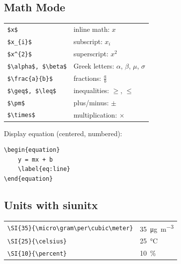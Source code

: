 \documentclass[../main.tex]{subfiles}
\begin{document}
\vspace{1em}

\subsection*{Math Mode}
\begin{tabular}{ll}
\texttt{\$x\$} & inline math: $x$ \\
\texttt{\$x\_\{i\}\$} & subscript: $x_{i}$ \\
\texttt{\$x\^{}\{2\}\$} & superscript: $x^{2}$ \\
\texttt{\$\textbackslash alpha\$, \$\textbackslash beta\$} & Greek letters: $\alpha$, $\beta$, $\mu$, $\sigma$ \\
\texttt{\$\textbackslash frac\{a\}\{b\}\$} & fractions: $\frac{a}{b}$ \\
\texttt{\$\textbackslash geq\$, \$\textbackslash leq\$} & inequalities: $\geq$, $\leq$ \\
\texttt{\$\textbackslash pm\$} & plus/minus: $\pm$ \\
\texttt{\$\textbackslash times\$} & multiplication: $\times$ \\
\end{tabular}

\vspace{0.5em}

Display equation (centered, numbered):
\begin{verbatim}
\begin{equation}
    y = mx + b
    \label{eq:line}
\end{equation}
\end{verbatim}

\vspace{1em}

\subsection*{Units with siunitx}
\begin{tabular}{ll}
\texttt{\textbackslash SI\{35\}\{\textbackslash micro\textbackslash gram\textbackslash per\textbackslash cubic\textbackslash meter\}} & \SI{35}{\micro\gram\per\cubic\meter} \\
\texttt{\textbackslash SI\{25\}\{\textbackslash celsius\}} & \SI{25}{\celsius} \\
\texttt{\textbackslash SI\{10\}\{\textbackslash percent\}} & \SI{10}{\percent} \\
\end{tabular}
\end{document}
